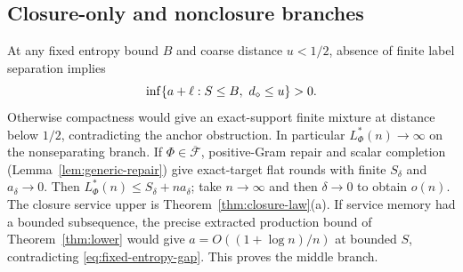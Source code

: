 \subsection{Closure-only and nonclosure branches}

At any fixed entropy bound $B$ and coarse distance $u<1/2$, absence of finite label separation implies
\begin{equation}\label{eq:fixed-entropy-gap}
 \inf\{a+\ell:S\le B,\ d_\diamond\le u\}>0.
\end{equation}
Otherwise compactness would give an exact-support finite mixture at distance below $1/2$, contradicting
the anchor obstruction. In particular $L^*_\Phi(n)\to\infty$ on the nonseparating branch.
If $\Phi\in\overline{\mathcal F}$, positive-Gram repair and scalar completion
(Lemma~\ref{lem:generic-repair}) give exact-target flat rounds with finite $S_\delta$ and $a_\delta\to0$.
Then $L^*_\Phi(n)\le S_\delta+na_\delta$; take $n\to\infty$ and then $\delta\to0$ to obtain $o(n)$.
The closure service upper is Theorem~\ref{thm:closure-law}(a).
If service memory had a bounded subsequence, the precise extracted production bound of
Theorem~\ref{thm:lower} would give $a=O((1+\log n)/n)$ at bounded $S$, contradicting
\eqref{eq:fixed-entropy-gap}. This proves the middle branch.

